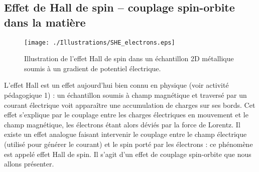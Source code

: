 \documentclass[a4paper,11pt]{article} %
\begin{document}
	
	\subsection{Effet de Hall de spin -- couplage spin-orbite dans la matière}
	
	\begin{figure}[h]
		\centering
		\begin{minipage}[c]{0.85\linewidth}
			\centering
			\texttt{[image: ./Illustrations/SHE\_electrons.eps]}
			\caption{Illustration de l'effet Hall de spin dans un échantillon 2D métallique soumis à un gradient de potentiel électrique.}
			\label{fig:spin-Hall-effect}
		\end{minipage}
	\end{figure}
	
	L'effet Hall est un effet aujourd'hui bien connu en physique (voir activité pédagogique 1) : un échantillon soumis à champ magnétique et traversé par un courant électrique voit apparaître une accumulation de charges sur ses bords. Cet effet s'explique par le couplage entre les charges électriques en mouvement et le champ magnétique, les électrons étant alors déviés par la force de Lorentz. Il existe un effet analogue faisant intervenir le couplage entre le champ électrique (utilisé pour générer le courant) et le spin porté par les électrons : ce phénomène est appelé effet Hall de spin. Il s'agit d'un effet de couplage spin-orbite que nous allons présenter.\\ 
	
\end{document}
